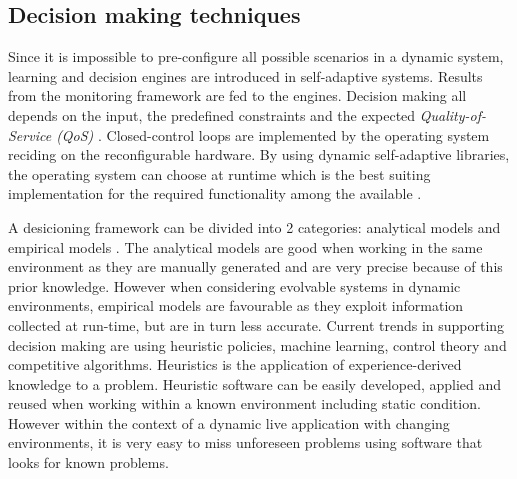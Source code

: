 \subsection{Decision making techniques}
\label{sec:decisions}
%
Since it is impossible to pre-configure all possible scenarios in a dynamic system, learning and decision engines are introduced in self-adaptive systems. Results from the monitoring framework are fed to the engines. Decision making all depends on the input, the predefined constraints and the expected \emph{Quality-of-Service (QoS)} \cite{evolvable}. Closed-control loops are implemented by the operating system reciding on the reconfigurable hardware. By using dynamic self-adaptive libraries, the operating system can choose at runtime which is the best suiting implementation for the required functionality among the available \cite{evolvable}.

A desicioning framework can be divided into 2 categories: analytical models and empirical models \cite{evolvable}. The analytical models are good when working in the same environment as they are manually generated and are very precise because of this prior knowledge. However when considering evolvable systems in dynamic environments, empirical models are favourable as they exploit information collected at run-time, but are in turn less accurate.
Current trends in supporting decision making are using heuristic policies, machine learning, control theory and competitive algorithms. Heuristics is the application of experience-derived knowledge to a problem. Heuristic software can be easily developed, applied and reused when working within a known environment including static condition. However within the context of a dynamic live application with changing environments, it is very easy to miss unforeseen problems using software that looks for known problems.


